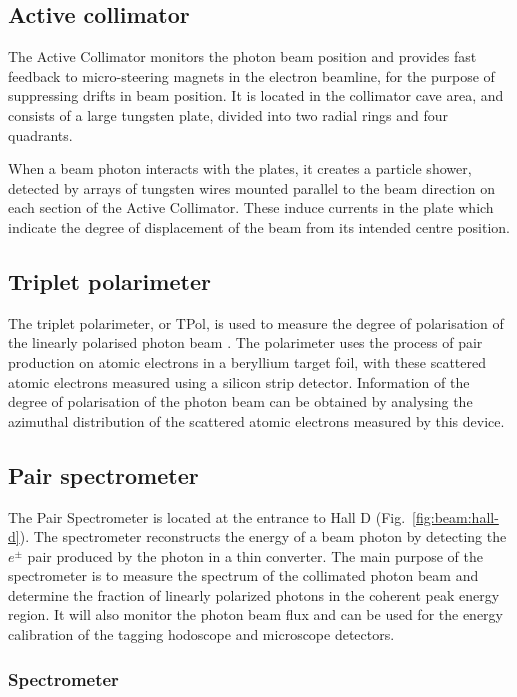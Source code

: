 \subsection{Active collimator \label{sec:coll}}
The Active Collimator monitors the photon beam position and provides fast feedback to micro-steering magnets in the electron beamline, for the purpose of suppressing drifts in beam position.
It is located in the collimator cave area, and consists of a large tungsten plate, divided into two radial rings and four quadrants.

When a beam photon interacts with the plates, it creates a particle shower, detected by arrays of tungsten wires mounted parallel to the beam direction on each section of the Active Collimator.
These induce currents in the plate which indicate the degree of displacement of the beam from its intended centre position.

\subsection{Triplet polarimeter \label{sec:tpol}}
The triplet polarimeter, or TPol, is used to measure the degree of polarisation of the linearly polarised photon beam \cite{DUGGER2017115}.
The polarimeter uses the process of pair production on atomic electrons in a beryllium target foil, with these scattered atomic electrons measured using a silicon strip detector.
Information of the degree of polarisation of the photon beam can be obtained by analysing the azimuthal distribution of the scattered atomic electrons measured by this device.

\subsection[Pair spectrometer (TCR)]{Pair spectrometer \label{sec:ps}}

The Pair Spectrometer is located at the entrance to Hall D
(Fig.~\ref{fig:beam:hall-d}).  The spectrometer reconstructs the
energy of a beam photon by detecting the $e^\pm$ pair produced by the
photon in a thin converter. The main purpose of the spectrometer is to
measure the spectrum of the collimated photon beam and determine the
fraction of linearly polarized photons in the coherent peak energy
region. It will also monitor the photon beam flux and can be used for
the energy calibration of the tagging hodoscope and microscope
detectors.


\subsubsection[Spectrometer]{Spectrometer
  \label{sec:beamline:ps-spetrometer}}

